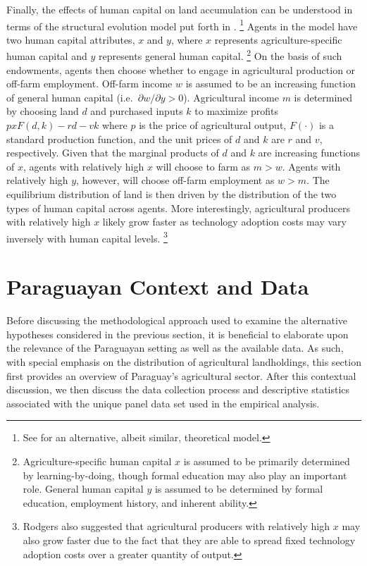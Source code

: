 \documentclass[english]{article}
\begin{document}
Finally, the effects of human capital on land accumulation can be understood
in terms of the structural evolution model put forth in \citet{rodgers1994}.%
\footnote{See \citet{sumner1987} for an alternative, albeit similar, theoretical
model.}
Agents in the model have two human capital attributes, $x$ and $y$, where
$x$ represents agriculture-specific human capital and $y$ represents general 
human capital.%
\footnote{Agriculture-specific human capital $x$ is assumed to be primarily 
determined by learning-by-doing, though formal education may also play an 
important role. 
General human capital $y$ is assumed to be determined by formal education, 
employment history, and inherent ability.}
On the basis of such endowments, agents then choose whether to engage in 
agricultural production or off-farm employment.
Off-farm income $w$ is assumed to be an increasing function of general
human capital (i.e.\ $\partial w/ \partial y > 0$). 
Agricultural income $m$ is determined by choosing land $d$ and purchased 
inputs $k$ to maximize profits $p x F(d,k) - rd - vk$ where $p$ is the price 
of agricultural output, $F(\cdot)$ is a standard production function, 
and the unit prices of $d$ and $k$ are $r$ and $v$, respectively.
Given that the marginal products of $d$ and $k$ are increasing functions of 
$x$, agents with relatively high $x$ will choose to farm as $m > w$.
Agents with relatively high $y$, however, will choose off-farm employment
 as $w > m$.
The equilibrium distribution of land is then driven by the distribution of the 
two types of human capital across agents.
More interestingly, agricultural producers with relatively high $x$ likely 
grow faster as technology adoption costs may vary inversely with human 
capital levels.%
\footnote{Rodgers also suggested that agricultural producers with relatively 
high $x$ may also grow faster due to the fact that they are able to spread fixed 
technology adoption costs over a greater quantity of output.}


\section{Paraguayan Context and Data}
\label{sec: data}

Before discussing the methodological approach used to examine the alternative
hypotheses considered in the previous section, it is beneficial to elaborate upon 
the relevance of the Paraguayan setting as well as the available data.
As such, with special emphasis on the distribution of agricultural landholdings, 
this section first provides an overview of Paraguay's agricultural sector. 
After this contextual discussion, we then discuss the data collection process 
and descriptive statistics associated with the unique panel data set used in the 
empirical analysis.
\end{document}
